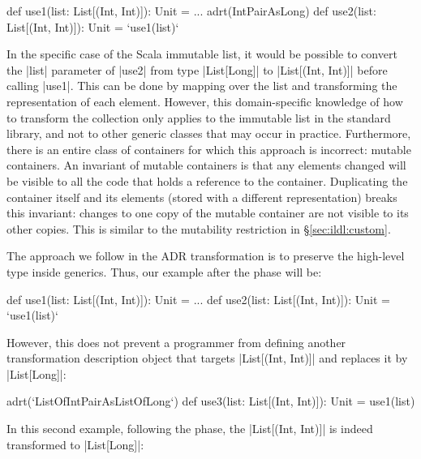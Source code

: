 \begin{lstlisting-nobreak}
def use1(list: List[(Int, Int)]): Unit = ...
adrt(IntPairAsLong) {
  def use2(list: List[(Int, Int)]): Unit = `use1(list)`
}
\end{lstlisting-nobreak}

In the specific case of the Scala immutable list, it would be possible to convert the |list| parameter of |use2| from type |List[Long]| to |List[(Int, Int)]| before calling |use1|. This can be done by mapping over the list and transforming the representation of each element. However, this domain-specific knowledge of how to transform the collection only applies to the immutable list in the standard library, and not to other generic classes that may occur in practice. Furthermore, there is an entire class of containers for which this approach is incorrect: mutable containers. An invariant of mutable containers is that any elements changed will be visible to all the code that holds a reference to the container. Duplicating the container itself and its elements (stored with a different representation) breaks this invariant: changes to one copy of the mutable container are not visible to its other copies. This is similar to the mutability restriction in \S\ref{sec:ildl:custom}.

The approach we follow in the ADR transformation is to preserve the high-level type inside generics. Thus, our example after the \commit{} phase will be:

\begin{lstlisting-nobreak}
def use1(list: List[(Int, Int)]): Unit = ...
def use2(list: List[(Int, Int)]): Unit = `use1(list)`
\end{lstlisting-nobreak}

However, this does not prevent a programmer from defining another transformation description object that targets |List[(Int, Int)]| and replaces it by |List[Long]|:

\begin{lstlisting-nobreak}
adrt(`ListOfIntPairAsListOfLong`) {
  def use3(list: List[(Int, Int)]): Unit = use1(list)
}
\end{lstlisting-nobreak}

In this second example, following the \commit{} phase, the |List[(Int, Int)]| is indeed transformed to |List[Long]|:

